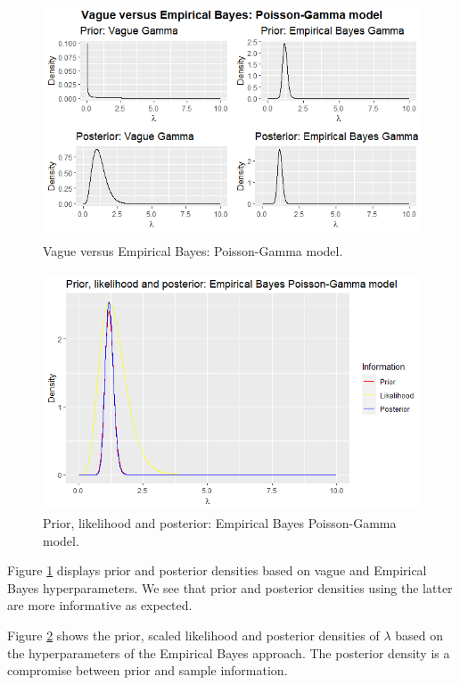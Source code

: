 \begin{figure}[!h]
	\includegraphics[width=340pt, height=200pt]{Chapters/chapter1/figures/PoisGam.png}
	\caption[List of figure caption goes here]{Vague versus Empirical Bayes: Poisson-Gamma model.}\label{fig12}
\end{figure}

\begin{figure}[!h]
	\includegraphics[width=340pt, height=200pt]{Chapters/chapter1/figures/PriorLikPost.png}
	\caption[List of figure caption goes here]{Prior, likelihood and posterior: Empirical Bayes Poisson-Gamma model.}\label{fig13}
\end{figure}

Figure \ref{fig12} displays prior and posterior densities based on vague and Empirical Bayes hyperparameters. We see that prior and posterior densities using the latter are more informative as expected.

Figure \ref{fig13} shows the prior, scaled likelihood and posterior densities of $\lambda$ based on the hyperparameters of the Empirical Bayes approach. The posterior density is a compromise between prior and sample information. 

